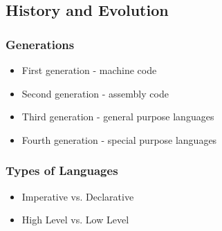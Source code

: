 \documentclass[usepdftitle=false,professionalfonts,compress ]{beamer}
\begin{document}
\subsection{History and Evolution}

{
\begin{frame}\frametitle{Generations}

	\begin{itemize}
	\item First generation - machine code
			\item Second generation - assembly code
			\item Third generation - general purpose languages
			\item Fourth generation - special purpose languages
				\end{itemize}

\end{frame}}






{
\begin{frame}\frametitle{Types of Languages}

	\begin{itemize}
	\item Imperative vs. Declarative
			\item High Level vs. Low Level
				\end{itemize}

\end{frame}}
\end{document}
